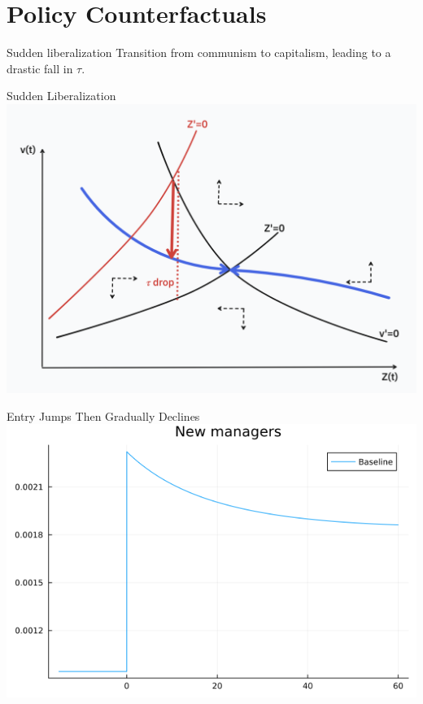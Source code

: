 \documentclass[
  ignorenonframetext,
  aspectratio=1610,
]{beamer}
\begin{document}
\hypertarget{policy-counterfactuals}{%
\section{Policy Counterfactuals}\label{policy-counterfactuals}}

\begin{frame}{Sudden liberalization}
\protect\hypertarget{sudden-liberalization}{}
Transition from communism to capitalism, leading to a drastic fall in
\(\tau\).
\end{frame}

\begin{frame}{Sudden Liberalization}
\protect\hypertarget{sudden-liberalization-1}{}
\includegraphics{fig/phase2.png}
\end{frame}

\begin{frame}{Entry Jumps Then Gradually Declines}
\protect\hypertarget{entry-jumps-then-gradually-declines}{}
\includegraphics{fig/model-entry-liberalization.png}
\end{frame}
\end{document}
